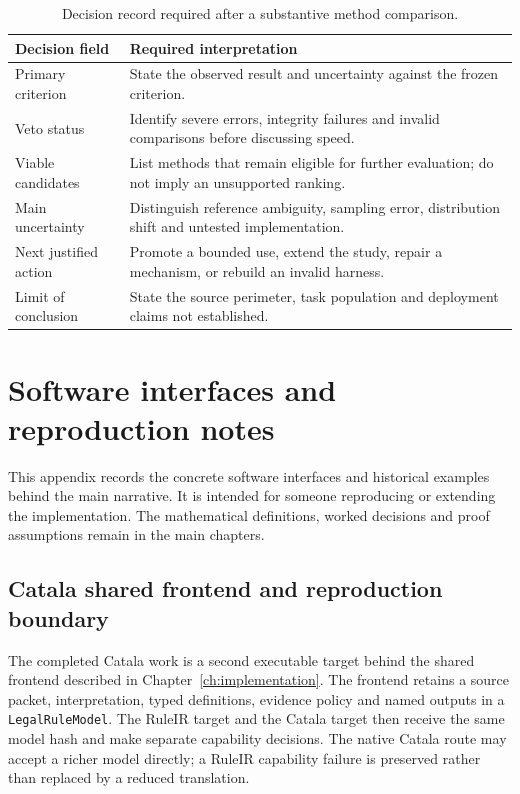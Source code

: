 \documentclass[12pt,a4paper,oneside,openany]{book}
\begin{document}
\begin{table}[htbp]
\centering\small
\caption{Decision record required after a substantive method comparison.}
\begin{tabularx}{\textwidth}{P{39mm}Y}
\toprule
Decision field & Required interpretation\\\midrule
Primary criterion & State the observed result and uncertainty against the frozen criterion.\\
Veto status & Identify severe errors, integrity failures and invalid comparisons before discussing speed.\\
Viable candidates & List methods that remain eligible for further evaluation; do not imply an unsupported ranking.\\
Main uncertainty & Distinguish reference ambiguity, sampling error, distribution shift and untested implementation.\\
Next justified action & Promote a bounded use, extend the study, repair a mechanism, or rebuild an invalid harness.\\
Limit of conclusion & State the source perimeter, task population and deployment claims not established.\\
\bottomrule
\end{tabularx}
\end{table}

\chapter{Software interfaces and reproduction notes}
\label{app:technical-reference}

This appendix records the concrete software interfaces and historical examples
behind the main narrative. It is intended for someone reproducing or extending
the implementation. The mathematical definitions, worked decisions and proof
assumptions remain in the main chapters.

\section{Catala shared frontend and reproduction boundary}
\label{app:catala-reproduction}

The completed Catala work is a second executable target behind the shared
frontend described in Chapter~\ref{ch:implementation}. The frontend retains a
source packet, interpretation, typed definitions, evidence policy and named
outputs in a \texttt{LegalRuleModel}. The RuleIR target and the Catala target
then receive the same model hash and make separate capability decisions.
The native Catala route may accept a richer model directly; a RuleIR
capability failure is preserved rather than replaced by a reduced translation.
\end{document}
